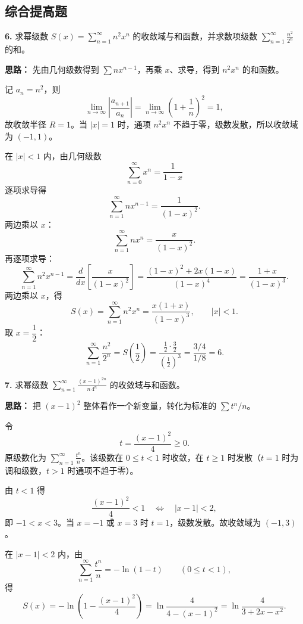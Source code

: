 \subsection{综合提高题}

\textbf{6.} 求幂级数 $\displaystyle S(x)=\sum_{n=1}^{\infty}n^2x^n$ 的收敛域与和函数，并求数项级数 $\displaystyle\sum_{n=1}^{\infty}\frac{n^2}{2^n}$ 的和。

\ifshowsolutions%
\textbf{思路：} 先由几何级数得到 $\sum nx^{n-1}$，再乘 $x$、求导，得到 $n^2x^n$ 的和函数。

记 $a_n=n^2$，则
\[
\lim_{n\to\infty}\left|\frac{a_{n+1}}{a_n}\right|
=\lim_{n\to\infty}\left(1+\frac1n\right)^2=1,
\]
故收敛半径 $R=1$。当 $|x|=1$ 时，通项 $n^2x^n$ 不趋于零，级数发散，所以收敛域为 $(-1,1)$。

在 $|x|<1$ 内，由几何级数
\[
\sum_{n=0}^{\infty}x^n=\frac{1}{1-x}
\]
逐项求导得
\[
\sum_{n=1}^{\infty}nx^{n-1}=\frac{1}{(1-x)^2}.
\]
两边乘以 $x$：
\[
\sum_{n=1}^{\infty}nx^n=\frac{x}{(1-x)^2}.
\]
再逐项求导：
\[
\sum_{n=1}^{\infty}n^2x^{n-1}
=\frac{d}{dx}\left[\frac{x}{(1-x)^2}\right]
=\frac{(1-x)^2+2x(1-x)}{(1-x)^4}
=\frac{1+x}{(1-x)^3}.
\]
两边乘以 $x$，得
\[
S(x)=\sum_{n=1}^{\infty}n^2x^n
=\frac{x(1+x)}{(1-x)^3},\qquad |x|<1.
\]
取 $x=\dfrac12$：
\[
\sum_{n=1}^{\infty}\frac{n^2}{2^n}
=S\left(\frac12\right)
=\frac{\frac12\cdot\frac32}{\left(\frac12\right)^3}
=\frac{3/4}{1/8}=6.
\]

\else \answerarea[8] \fi%

\textbf{7.} 求幂级数 $\displaystyle\sum_{n=1}^{\infty}\frac{(x-1)^{2n}}{n\,4^n}$ 的收敛域与和函数。

\ifshowsolutions%
\textbf{思路：} 把 $(x-1)^2$ 整体看作一个新变量，转化为标准的 $\sum t^n/n$。

令
\[
t=\frac{(x-1)^2}{4}\ge0.
\]
原级数化为 $\displaystyle\sum_{n=1}^{\infty}\frac{t^n}{n}$。该级数在 $0\le t<1$ 时收敛，在 $t\ge1$ 时发散（$t=1$ 时为调和级数，$t>1$ 时通项不趋于零）。

由 $t<1$ 得
\[
\frac{(x-1)^2}{4}<1
\quad\Longleftrightarrow\quad
|x-1|<2,
\]
即 $-1<x<3$。当 $x=-1$ 或 $x=3$ 时 $t=1$，级数发散。故收敛域为 $(-1,3)$。

在 $|x-1|<2$ 内，由
\[
\sum_{n=1}^{\infty}\frac{t^n}{n}=-\ln(1-t)\qquad(0\le t<1),
\]
得
\[
S(x)=-\ln\left(1-\frac{(x-1)^2}{4}\right)
=\ln\frac{4}{4-(x-1)^2}
=\ln\frac{4}{3+2x-x^2}.
\]

